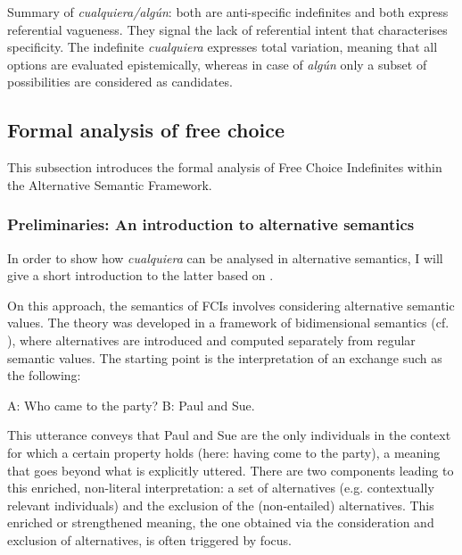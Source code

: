 Summary of \textit{cualquiera/algún}: both are anti-specific indefinites and both express referential vagueness. They signal the lack of referential intent that characterises specificity. The indefinite \textit{cualquiera} expresses total variation, meaning that all options are evaluated epistemically, whereas in case of \textit{algún} only a subset of possibilities are considered as candidates.

\subsection{{Formal} {analysis} {of} {free} {choice}} \label{sec:2.2.2}
\largerpage
This subsection introduces the formal analysis of Free Choice Indefinites within the Alternative Semantic Framework.

\subsubsection{{Preliminaries: An introduction to alternative semantics}} \label{sec:2.2.2.1}

In order to show how \textit{cualquiera} can be analysed in alternative semantics, I will give a short introduction to the latter based on \citet{Falaus2014}.

On this approach, the semantics of FCIs involves considering alternative semantic values. The theory was developed in a framework of bidimensional semantics (cf. \citealt{Rooth1985}), where alternatives are introduced and computed separately from regular semantic values. The starting point is the interpretation of an exchange such as the following:

\ea \label{ex:key:76} %
\ea \label{ex:key:76-1} A: Who came to the party?
\ex \label{ex:key:76-2} B: Paul and Sue.
\z
\z

This utterance conveys that Paul and Sue are the only individuals in the context for which a certain property holds (here: having come to the party), a meaning that goes beyond what is explicitly uttered. There are two components leading to this enriched, non-literal interpretation:  a set of alternatives (e.g. contextually relevant individuals) and  the exclusion of the (non-entailed) alternatives. This enriched or strengthened meaning, the one obtained via the consideration and exclusion of alternatives, is often triggered by focus.

